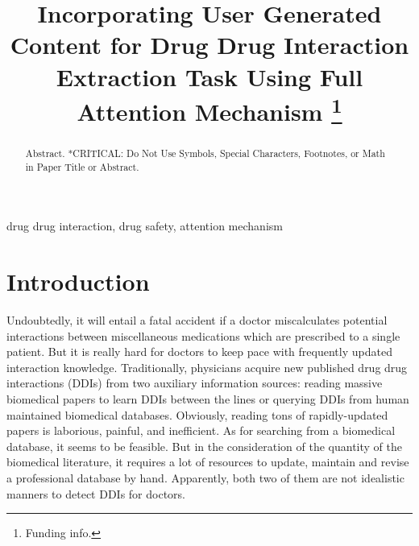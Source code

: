 \documentclass[conference]{IEEEtran}
\begin{document}
\title{Incorporating User Generated Content for Drug Drug Interaction Extraction Task Using Full Attention Mechanism
\thanks{Funding info.}
}

\author{
\and
{}
\and
{}
}

\maketitle

\begin{abstract}
Abstract.
*CRITICAL: Do Not Use Symbols, Special Characters, Footnotes, 
or Math in Paper Title or Abstract.
\end{abstract}

\begin{IEEEkeywords}
drug drug interaction, drug safety, attention mechanism
\end{IEEEkeywords}

\section{Introduction}
Undoubtedly, it will entail a fatal accident if a doctor miscalculates potential interactions
between miscellaneous medications which are prescribed to a single patient.
But it is really hard for doctors to keep pace with frequently updated interaction knowledge.
Traditionally, physicians acquire new published drug drug interactions (DDIs) from two auxiliary information sources:
reading massive biomedical papers to learn DDIs between the lines
or querying DDIs from human maintained biomedical databases.
Obviously, reading tons of rapidly-updated papers is laborious, painful, and inefficient.
As for searching from a biomedical database, it seems to be feasible.
But in the consideration of the quantity of the biomedical literature,
it requires a lot of resources to update, maintain and revise a professional database by hand.
Apparently, both two of them are not idealistic manners to detect DDIs for doctors.
\end{document}
